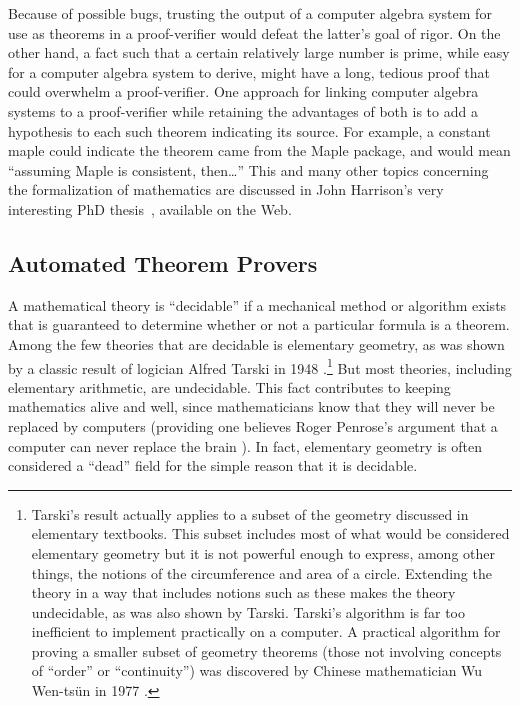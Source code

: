 Because of possible bugs, trusting the output of a computer algebra system for
use as theorems in a proof-verifier would defeat the latter's goal of rigor.
On the other hand, a fact such that a certain relatively large number is
prime, while easy for a computer algebra system to derive, might have a long,
tedious proof that could overwhelm a proof-verifier. One approach for linking
computer algebra systems to a proof-verifier while retaining the advantages of
both is to add a hypothesis to each such theorem indicating its source.  For
example, a constant {\sc maple} could indicate the theorem came from the Maple
package, and would mean ``assuming Maple is consistent, then\ldots''  This and
many other topics concerning the formalization of mathematics are discussed in
John Harrison's very interesting
PhD thesis~\cite{Harrison-thesis}, available
on the Web.

\subsection{Automated Theorem Provers}\label{theoremprovers}

A mathematical theory is ``decidable'' if a mechanical
method or algorithm exists that is guaranteed to determine whether or not a
particular formula is a theorem.  Among the few theories that are decidable is
elementary geometry, as was shown by a classic
result of logician Alfred Tarski in 1948
\cite{Tarski}.\footnote{Tarski's result actually applies to a subset of the
geometry discussed in elementary textbooks.  This subset includes most of what
would be considered elementary geometry but it is not powerful enough to
express, among other things, the notions of the circumference and area of a
circle.  Extending the theory in a way that includes notions such as these
makes the theory undecidable, as was also shown by Tarski.  Tarski's algorithm
is far too inefficient to implement practically on a computer.  A practical
algorithm for proving a smaller subset of geometry theorems (those not
involving concepts of ``order'' or ``continuity'') was discovered by Chinese
mathematician Wu Wen-ts\"{u}n in 1977 \cite{Chou}.}  But most theories, including
elementary arithmetic, are undecidable.  This fact contributes to keeping
mathematics alive and well, since mathematicians know that they will never be
replaced by computers (providing one believes Roger Penrose's argument that a
computer can never replace the brain \cite{Penrose}). In
fact,  elementary geometry is often considered a ``dead'' field for the simple
reason that it is decidable.

